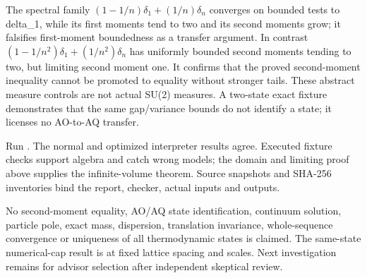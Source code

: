 The spectral family \((1-1/n)\delta_1+(1/n)\delta_n\) converges on bounded tests to delta\_1, while its first moments tend to two and its second moments grow; it falsifies first-moment boundedness as a transfer argument. In contrast \((1-1/n^{2})\delta_1+(1/n^{2})\delta_n\) has uniformly bounded second moments tending to two, but limiting second moment one. It confirms that the proved second-moment inequality cannot be promoted to equality without stronger tails. These abstract measure controls are not actual SU(2) measures. A two-state exact fixture demonstrates that the same gap/variance bounds do not identify a state; it licenses no AO-to-AQ transfer.

Run {\small{}}. The normal and optimized interpreter results agree. Executed fixture checks support algebra and catch wrong models; the domain and limiting proof above supplies the infinite-volume theorem. Source snapshots and SHA-256 inventories bind the report, checker, actual inputs and outputs.

No second-moment equality, AO/AQ state identification, continuum solution, particle pole, exact mass, dispersion, translation invariance, whole-sequence convergence or uniqueness of all thermodynamic states is claimed. The same-state numerical-cap result is at fixed lattice spacing and scales. Next investigation remains for advisor selection after independent skeptical review.

